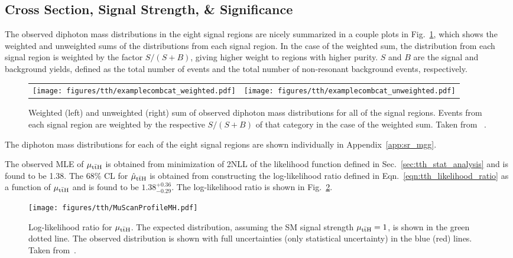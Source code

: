 \subsection{Cross Section, Signal Strength, \& Significance}
The observed diphoton mass distributions in the eight signal regions are nicely summarized in a couple plots in Fig.~\ref{fig:tth_obs_sr_weighted}, which shows the weighted and unweighted sums of the distributions from each signal region.
In the case of the weighted sum, the distribution from each signal region is weighted by the factor $S / (S + B)$, giving higher weight to regions with higher purity.
$S$ and $B$ are the signal and background yields, defined as the total number of \Hgg events and the total number of non-resonant background events, respectively.
\begin{figure} [htbp!]
    \centering
    \begin{tabular} {c c}
        \texttt{[image: figures/tth/examplecombcat\_weighted.pdf]} &
        \texttt{[image: figures/tth/examplecombcat\_unweighted.pdf]}
    \end{tabular}
    \caption{Weighted (left) and unweighted (right) sum of observed diphoton mass distributions for all of the signal regions. Events from each signal region are weighted by the respective $S / (S +B)$ of that category in the case of the weighted sum. Taken from ~\cite{tth_observation}.}
    \label{fig:tth_obs_sr_weighted}
\end{figure}

The diphoton mass distributions for each of the eight signal regions are shown individually in Appendix~\ref{app:sr_mgg}.

The observed MLE of $\mu_{\mathrm{t\bar{t}H}}$ is obtained from minimization of 2NLL of the likelihood function defined in Sec.~\ref{sec:tth_stat_analysis} and is found to be 1.38.
The 68\% CL for $\hat{\mu}_{\mathrm{t\bar{t}H}}$ is obtained from constructing the log-likelihood ratio defined in Eqn.~\ref{eqn:tth_likelihood_ratio} as a function of $\mu_{\mathrm{t\bar{t}H}}$ and is found to be $1.38^{+0.36}_{-0.29}$.
The log-likelihood ratio is shown in Fig.~\ref{fig:tth_llr}.

\begin{figure} [htbp!]
    \centering
    \texttt{[image: figures/tth/MuScanProfileMH.pdf]}
    \caption{Log-likelihood ratio for $\mu_{\mathrm{t\bar{t}H}}$. The expected distribution, assuming the SM signal strength $\mu_{\mathrm{t\bar{t}H}} = 1$, is shown in the green dotted line. The observed distribution is shown with full uncertainties (only statistical uncertainty) in the blue (red) lines. Taken from~\cite{tth_observation}.}
    \label{fig:tth_llr}
\end{figure}

